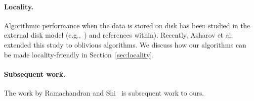\paragraph{Locality.} Algorithmic performance when the data is stored on disk has been studied in the external disk model (e.g.,~\cite{RuemmlerW94,ArgeFGV97,Vitter01,Vitter06}) and references within). Recently, Asharov et al.~\cite{AsharovCNPRS19} extended this study to oblivious algorithms.  We discuss how our algorithms can be made locality-friendly in Section~\ref{sec:locality}. 

\paragraph{Subsequent work.}
The work by Ramachandran and Shi~\cite{Ramachandran} is subsequent work to ours.


%
%
%
%
%


